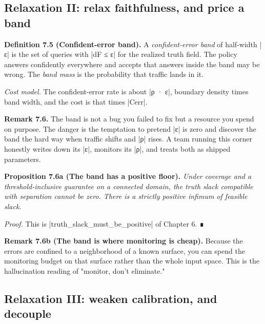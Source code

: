 \documentclass{memoir}
\begin{document}
\subsection{Relaxation II: relax faithfulness, and price a band}\label{Two--Schemas--of--Impossibility-005F-005F-005F--Machine--Checked--Limits--of--Trustworthy--Machine--Learning-005F-005F-005F--and--Why--They--Tighten--with--Capability----What--It--Means--for--AI--Safety----Three--relaxations-005F-005F-005F--three--cost--models----Relaxation--II-005F-005F-005F--relax--faithfulness-005F-005F-005F--and--price--a--band}

\textbf{Definition 7.5 (Confident-error band).} A \emph{confident-error band} of half-width \LeanVerb|ε|
is the set of queries with \LeanVerb|dF ≤ ε| for the realized truth field. The policy
answers confidently everywhere and accepts that answers inside the band may be
wrong. The \emph{band mass} is the probability that traffic lands in it.

\emph{Cost model.} The confident-error rate is about \LeanVerb|ρ · ε|, boundary density times
band width, and the cost is that times \LeanVerb|Cerr|.

\textbf{Remark 7.6.} The band is not a bug you failed to fix but a resource you spend on
purpose. The danger is the temptation to pretend \LeanVerb|ε| is zero and discover the
band the hard way when traffic shifts and \LeanVerb|ρ| rises. A team running this corner
honestly writes down its \LeanVerb|ε|, monitors its \LeanVerb|ρ|, and treats both as shipped
parameters.

\textbf{Proposition 7.6a (The band has a positive floor).} \emph{Under coverage and a
threshold-inclusive guarantee on a connected domain, the truth slack compatible
with separation cannot be zero. There is a strictly positive infimum of feasible
slack.}

\emph{Proof.} This is \LeanVerb|truth_slack_must_be_positive| of Chapter 6. ∎

\textbf{Remark 7.6b (The band is where monitoring is cheap).} Because the errors are
confined to a neighborhood of a known surface, you can spend the monitoring
budget on that surface rather than the whole input space. This is the
hallucination reading of "monitor, don't eliminate."



\subsection{Relaxation III: weaken calibration, and decouple}\label{Two--Schemas--of--Impossibility-005F-005F-005F--Machine--Checked--Limits--of--Trustworthy--Machine--Learning-005F-005F-005F--and--Why--They--Tighten--with--Capability----What--It--Means--for--AI--Safety----Three--relaxations-005F-005F-005F--three--cost--models----Relaxation--III-005F-005F-005F--weaken--calibration-005F-005F-005F--and--decouple}
\end{document}
